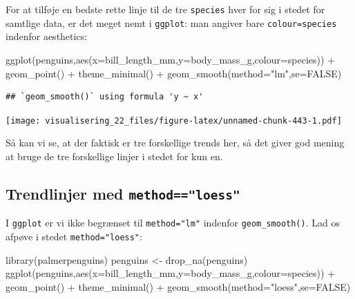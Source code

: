 \documentclass[
]{book}
\newenvironment{Shaded}{\begin{snugshade}}{\end{snugshade}}
\newcommand{\AttributeTok}[1]{\textcolor[rgb]{0.77,0.63,0.00}{#1}}
\newcommand{\ConstantTok}[1]{\textcolor[rgb]{0.00,0.00,0.00}{#1}}
\newcommand{\FunctionTok}[1]{\textcolor[rgb]{0.00,0.00,0.00}{#1}}
\newcommand{\NormalTok}[1]{#1}
\newcommand{\OtherTok}[1]{\textcolor[rgb]{0.56,0.35,0.01}{#1}}
\newcommand{\SpecialCharTok}[1]{\textcolor[rgb]{0.00,0.00,0.00}{#1}}
\newcommand{\StringTok}[1]{\textcolor[rgb]{0.31,0.60,0.02}{#1}}
\begin{document}
For at tilføje en bedste rette linje til de tre \texttt{species} hver for sig i stedet for samtlige data, er det meget nemt i \texttt{ggplot}: man angiver bare \texttt{colour=species} indenfor aesthetics:

\begin{Shaded}
\begin{Highlighting}[]
\FunctionTok{ggplot}\NormalTok{(penguins,}\FunctionTok{aes}\NormalTok{(}\AttributeTok{x=}\NormalTok{bill\_length\_mm,}\AttributeTok{y=}\NormalTok{body\_mass\_g,}\AttributeTok{colour=}\NormalTok{species)) }\SpecialCharTok{+} 
  \FunctionTok{geom\_point}\NormalTok{() }\SpecialCharTok{+} 
  \FunctionTok{theme\_minimal}\NormalTok{() }\SpecialCharTok{+} 
  \FunctionTok{geom\_smooth}\NormalTok{(}\AttributeTok{method=}\StringTok{"lm"}\NormalTok{,}\AttributeTok{se=}\ConstantTok{FALSE}\NormalTok{)}
\end{Highlighting}
\end{Shaded}

\begin{verbatim}
## `geom_smooth()` using formula 'y ~ x'
\end{verbatim}

\texttt{[image: visualisering\_22\_files/figure-latex/unnamed-chunk-443-1.pdf]}

Så kan vi se, at der faktisk er tre forskellige trends her, så det giver god mening at bruge de tre forskellige linjer i stedet for kun en.

\hypertarget{trendlinjer-med-methodloess}{%
\subsection{\texorpdfstring{Trendlinjer med \texttt{method=="loess"}}{Trendlinjer med method=="loess"}}\label{trendlinjer-med-methodloess}}

I \texttt{ggplot} er vi ikke begrænset til \texttt{method="lm"} indenfor \texttt{geom\_smooth()}. Lad os afpøve i stedet \texttt{method="loess"}:

\begin{Shaded}
\begin{Highlighting}[]
\FunctionTok{library}\NormalTok{(palmerpenguins)}
\NormalTok{penguins }\OtherTok{\textless{}{-}} \FunctionTok{drop\_na}\NormalTok{(penguins)}
\FunctionTok{ggplot}\NormalTok{(penguins,}\FunctionTok{aes}\NormalTok{(}\AttributeTok{x=}\NormalTok{bill\_length\_mm,}\AttributeTok{y=}\NormalTok{body\_mass\_g,}\AttributeTok{colour=}\NormalTok{species)) }\SpecialCharTok{+} 
  \FunctionTok{geom\_point}\NormalTok{() }\SpecialCharTok{+} 
  \FunctionTok{theme\_minimal}\NormalTok{() }\SpecialCharTok{+} 
  \FunctionTok{geom\_smooth}\NormalTok{(}\AttributeTok{method=}\StringTok{"loess"}\NormalTok{,}\AttributeTok{se=}\ConstantTok{FALSE}\NormalTok{)}
\end{Highlighting}
\end{Shaded}
\end{document}
